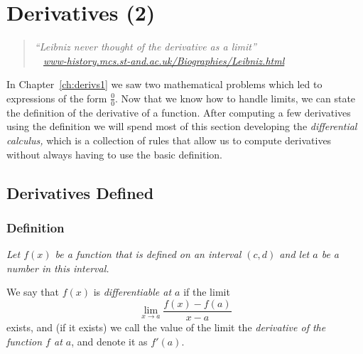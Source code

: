 
\chapter{Derivatives (2)}




\begin{quote}\itshape
    ``Leibniz never thought of the derivative as a limit''\\[1ex]
  \footnotesize~\hfill
  \href{http://www-history.mcs.st-and.ac.uk/Biographies/Leibniz.html}
  {www-history.mcs.st-and.ac.uk/Biographies/Leibniz.html}\\
\end{quote}




\medskip




\noindent
In Chapter~\ref{ch:derivs1} we saw two mathematical problems which led
to expressions of the form $\frac00$.  Now that we know how to handle
limits, we can state the definition of the derivative of a function.
\marginpar{\footnotesize\sffamily%
  \\
  \\
  \\
   }%
After computing a few derivatives using the definition we will spend
most of this section developing the \textit{differential calculus,}
which is a collection of rules that allow us to compute derivatives
without always having to use the basic definition.




\section{Derivatives Defined} 
%
\subsection{Definition} 
\label{def:derivative}\itshape
Let $f(x)$ be a function that is defined on an interval $(c, d)$
and let $a$ be a number in this interval.




We say that $f(x)$ is \emph{differentiable at $a$} if the limit
\begin{equation}\label{eq:derivative-defined}
  \lim_{x\to a} \frac{f(x)-f(a)}{x-a}
\end{equation}
exists, and (if it exists) we call the value of the limit the \emph{derivative
of the function $f$ at $a$}, and denote it as $f'(a)$.




